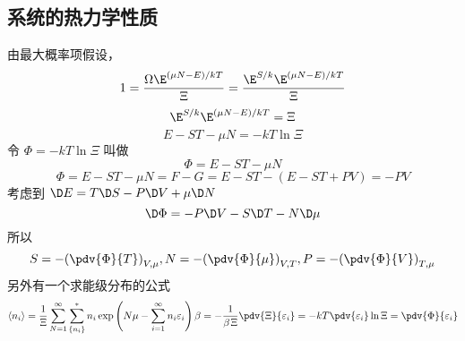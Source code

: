 \subsection{系统的热力学性质}
由最大概率项假设，
\begin{equation}
1 = \frac{\Omega {\E^{{\left( {\mu N - E} \right)} \mathord{\left/
 {\vphantom {{\left( {\mu N - E} \right)} {kT}}} \right.
 \kern-\nulldelimiterspace} {kT}}}}{\Xi } = \frac{{\E^{S/k}}{\E^{{\left( {\mu N - E} \right)} \mathord{\left/
 {\vphantom {{\left( {\mu N - E} \right)} {kT}}} \right.
 \kern-\nulldelimiterspace} {kT}}}}{\Xi }
\end{equation}
\begin{equation} 
 {\E^{S/k}}{\E^{{\left( {\mu N - E} \right)} \mathord{\left/
 {\vphantom {{\left( {\mu N - E} \right)} {kT}}} \right.
 \kern-\nulldelimiterspace} {kT}}} = \Xi 
\end{equation}
\begin{equation} 
 E - ST - \mu N =  - kT\ln \Xi
\end{equation}
令 $\Phi  =  - kT\ln \Xi $ 叫做
\begin{equation}
 \Phi  = E - ST - \mu N
\end{equation}
\begin{equation}
\Phi  = E - ST - \mu N = F - G = E - ST - (E - ST + PV) =  - PV
\end{equation}
考虑到 $ \D E = T\D S - P\D V + \mu \D N$
\begin{equation}
\D \Phi  =  - P\D V - S\D T - N\D \mu
\end{equation}
所以
\begin{equation}
S =  - {\left( {\pdv{\Phi}{T}} \right)_{V,\mu }} , N =  - {\left( {\pdv{\Phi}{\mu}} \right)_{V,T}} , P =  - {\left( {\pdv{\Phi}{V}} \right)_{T,\mu }}
\end{equation}
另外有一个求能级分布的公式
\begin{equation}
\left\langle {n_i} \right\rangle  = \frac{1}{\Xi }\sum\limits_{N = 1}^\infty  {\sum\limits_{\{ {n_i}\} }^ *  {{n_i}\exp \left( {N\mu  - \sum\limits_{i = 1}^\infty  {{n_i}{\varepsilon_i}} } \right)\beta } }  =  - \frac{1}{\beta {\kern 1pt} \Xi } \pdv{\Xi}{\varepsilon_i} =  - kT \pdv{\varepsilon_i} \ln \Xi  = \pdv{\Phi}{\varepsilon_i}
\end{equation}